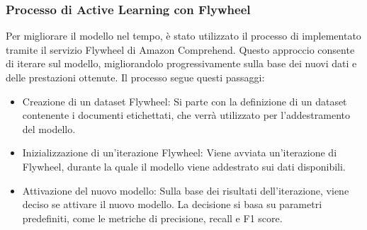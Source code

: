 \subsubsection{Processo di Active Learning con Flywheel}
Per migliorare il modello nel tempo, è stato utilizzato il processo di  implementato tramite il servizio Flywheel di Amazon Comprehend. Questo approccio consente di iterare sul modello, migliorandolo progressivamente sulla base dei nuovi dati e delle prestazioni ottenute. Il processo segue questi passaggi:

\begin{itemize}
    \item Creazione di un dataset Flywheel: Si parte con la definizione di un dataset contenente i documenti etichettati, che verrà utilizzato per l'addestramento del modello.
    \item Inizializzazione di un'iterazione Flywheel: Viene avviata un'iterazione di Flywheel, durante la quale il modello viene addestrato sui dati disponibili.
    \item Attivazione del nuovo modello: Sulla base dei risultati dell'iterazione, viene deciso se attivare il nuovo modello. La decisione si basa su parametri predefiniti, come le metriche di precisione, recall e F1 score.
\end{itemize}




